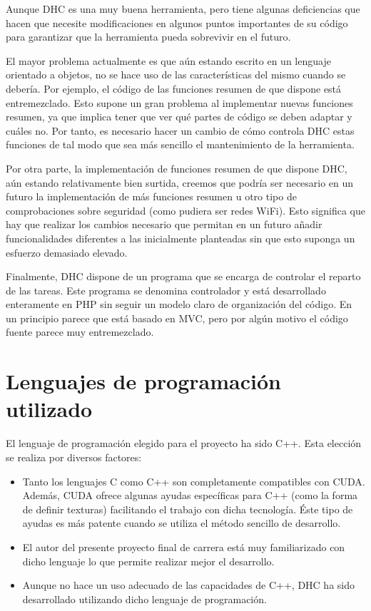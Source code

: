 Aunque DHC es una muy buena herramienta, pero tiene algunas deficiencias que hacen que necesite modificaciones en algunos puntos importantes de su código para garantizar que la herramienta pueda sobrevivir en el futuro.

El mayor problema actualmente es que aún estando escrito en un lenguaje orientado a objetos, no se hace uso de las características del mismo cuando se debería. Por ejemplo, el código de las funciones resumen de que dispone está entremezclado. Esto supone un gran problema al implementar nuevas funciones resumen, ya que implica tener que ver qué partes de código se deben adaptar y cuáles no. Por tanto, es necesario hacer un cambio de cómo controla DHC estas funciones de tal modo que sea más sencillo el mantenimiento de la herramienta.

Por otra parte, la implementación de funciones resumen de que dispone DHC, aún estando relativamente bien surtida, creemos que podría ser necesario en un futuro la implementación de más funciones resumen u otro tipo de comprobaciones sobre seguridad (como pudiera ser redes WiFi). Esto significa que hay que realizar los cambios necesario que permitan en un futuro añadir funcionalidades diferentes a las inicialmente planteadas sin que esto suponga un esfuerzo demasiado elevado.

Finalmente, DHC dispone de un programa que se encarga de controlar el reparto de las tareas. Este programa se denomina controlador y está desarrollado enteramente en PHP sin seguir un modelo claro de organización del código. En un principio parece que está basado en MVC, pero por algún motivo el código fuente parece muy entremezclado.

\section{Lenguajes de programación utilizado}

El lenguaje de programación elegido para el proyecto ha sido C++. Esta elección se realiza por diversos factores:

\begin{itemize}
	\item Tanto los lenguajes C como C++ son completamente compatibles con CUDA. Además, CUDA ofrece algunas ayudas específicas para C++ (como la forma de definir texturas) facilitando el trabajo con dicha tecnología. Éste tipo de ayudas es más patente cuando se utiliza el método sencillo de desarrollo.
	\item El autor del presente proyecto final de carrera está muy familiarizado con dicho lenguaje lo que permite realizar mejor el desarrollo.
	\item Aunque no hace un uso adecuado de las capacidades de C++, DHC ha sido desarrollado utilizando dicho lenguaje de programación.
\end{itemize}


